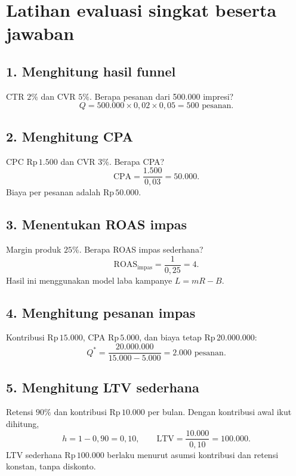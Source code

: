 \documentclass[11pt,a4paper]{article}
\newcommand{\bagian}[1]{\Needspace{5\baselineskip}\subsection{#1}}
\newcommand{\CPA}{\mathrm{CPA}}
\newcommand{\ROAS}{\mathrm{ROAS}}
\newcommand{\LTV}{\mathrm{LTV}}
\newcommand{\rp}[1]{\ensuremath{\mathrm{Rp}\,#1}}
\begin{document}
\clearpage
\section{Latihan evaluasi singkat beserta jawaban}
\bagian{1. Menghitung hasil funnel}
CTR \(2\%\) dan CVR \(5\%\). Berapa pesanan dari 500.000 impresi?
\[
Q=500.000\times0{,}02\times0{,}05=500\text{ pesanan}.
\]
\bagian{2. Menghitung CPA}
CPC \rp{1.500} dan CVR \(3\%\). Berapa CPA?
\[
\CPA=\frac{1.500}{0{,}03}=50.000.
\]
Biaya per pesanan adalah \rp{50.000}.
\bagian{3. Menentukan ROAS impas}
Margin produk \(25\%\). Berapa ROAS impas sederhana?
\[
\ROAS_{\text{impas}}=\frac{1}{0{,}25}=4.
\]
Hasil ini menggunakan model laba kampanye \(L=mR-B\).
\bagian{4. Menghitung pesanan impas}
Kontribusi \rp{15.000}, CPA \rp{5.000}, dan biaya tetap \rp{20.000.000}:
\[
Q^*=\frac{20.000.000}{15.000-5.000}=2.000\text{ pesanan}.
\]
\bagian{5. Menghitung LTV sederhana}
Retensi \(90\%\) dan kontribusi \rp{10.000} per bulan. Dengan kontribusi awal ikut dihitung,
\[
h=1-0{,}90=0{,}10,\qquad
\LTV=\frac{10.000}{0{,}10}=100.000.
\]
LTV sederhana \rp{100.000} berlaku menurut asumsi kontribusi dan retensi konstan, tanpa diskonto.

\clearpage
\end{document}
